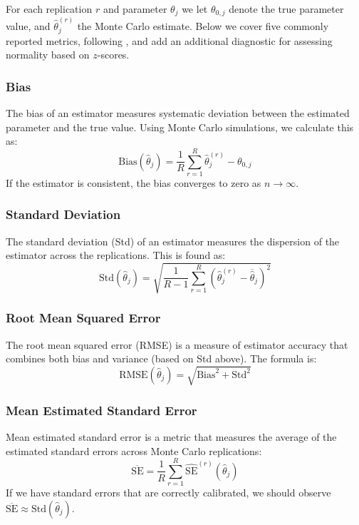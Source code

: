 For each replication $r$ and parameter $\theta_j$ we let $\theta_{0,j}$ denote the true parameter value, and $\hat\theta_j^{(r)}$ the Monte Carlo estimate. Below we cover five commonly reported metrics, following \textcite[Sec.~5.2]{MorrisWhiteEtAl2019}, and add an additional diagnostic for assessing normality based on $z$-scores.

\subsubsection{Bias}
The bias of an estimator measures systematic deviation between the estimated parameter and the true value. Using Monte Carlo simulations, we calculate this as:
\begin{equation}
    \text{Bias}(\hat\theta_j) = \frac{1}{R}\sum_{r=1}^{R}\hat\theta_j^{(r)} - \theta_{0,j}
\end{equation}
If the estimator is consistent, the bias converges to zero as $n \to \infty$.

\subsubsection{Standard Deviation}
The standard deviation (Std) of an estimator measures the dispersion of the estimator across the replications. This is found as:
\begin{equation}
    \text{Std}(\hat\theta_j) = \sqrt{\frac{1}{R-1}\sum_{r=1}^{R}\left(\hat\theta_j^{(r)} - \overline{\hat\theta}_j\right)^2}
\end{equation}

\subsubsection{Root Mean Squared Error}
The root mean squared error (RMSE) is a measure of estimator accuracy that combines both bias and variance (based on Std above). The formula is:
\begin{equation}
    \text{RMSE}(\hat\theta_j) = \sqrt{\text{Bias}^2 + \text{Std}^2}
\end{equation}

\subsubsection{Mean Estimated Standard Error}
Mean estimated standard error is a metric that measures the average of the estimated standard errors across Monte Carlo replications:
\begin{equation}
    \overline{\text{SE}} = \frac{1}{R}\sum_{r=1}^{R}\widehat{\text{SE}}^{(r)}(\hat\theta_j)
\end{equation}
If we have standard errors that are correctly calibrated, we should observe $\overline{\text{SE}} \approx \text{Std}(\hat\theta_j)$.


